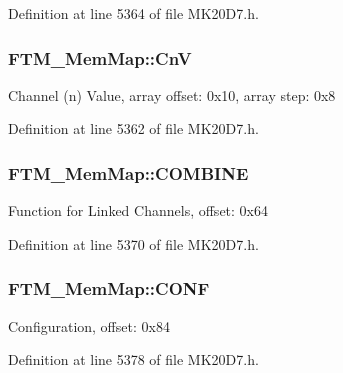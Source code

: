 Definition at line 5364 of file M\+K20\+D7.\+h.

\subsubsection[{\texorpdfstring{CnV}{CnV}}]{ F\+T\+M\+\_\+\+Mem\+Map\+::\+CnV}\hypertarget{struct_f_t_m___mem_map_a45398334c1dab06457c71ec0d5f5a7aa}{}\label{struct_f_t_m___mem_map_a45398334c1dab06457c71ec0d5f5a7aa}
Channel (n) Value, array offset\+: 0x10, array step\+: 0x8 

Definition at line 5362 of file M\+K20\+D7.\+h.

\subsubsection[{\texorpdfstring{C\+O\+M\+B\+I\+NE}{COMBINE}}]{ F\+T\+M\+\_\+\+Mem\+Map\+::\+C\+O\+M\+B\+I\+NE}\hypertarget{struct_f_t_m___mem_map_ab00737276f6086e805d6d7c892608100}{}\label{struct_f_t_m___mem_map_ab00737276f6086e805d6d7c892608100}
Function for Linked Channels, offset\+: 0x64 

Definition at line 5370 of file M\+K20\+D7.\+h.

\subsubsection[{\texorpdfstring{C\+O\+NF}{CONF}}]{ F\+T\+M\+\_\+\+Mem\+Map\+::\+C\+O\+NF}\hypertarget{struct_f_t_m___mem_map_a7b48a7fbd1a47ba72e009b9d82b89cf6}{}\label{struct_f_t_m___mem_map_a7b48a7fbd1a47ba72e009b9d82b89cf6}
Configuration, offset\+: 0x84 

Definition at line 5378 of file M\+K20\+D7.\+h.

